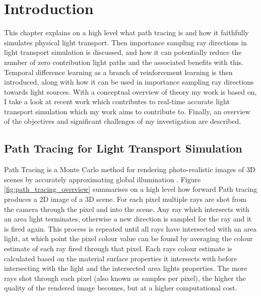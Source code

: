 \documentclass[../dissertation.tex]{subfiles}
\begin{document}
\chapter{Introduction}
\label{chap:context}


This chapter explains on a high level what path tracing is and how it faithfully
simulates physical light transport. Then importance sampling ray directions in light
transport simulation is discussed, and how it can potentially reduce the number 
of zero contribution light paths and the associated benefits with this. Temporal 
difference learning as a branch of reinforcement learning is then introduced, 
along with how it can be used in importance sampling ray directions towards 
light sources. With a conceptual overview of theory my work is based on, I take 
a look at recent work which contributes to real-time accurate light transport 
simulation which my work aims to contribute to. Finally, an overview of the 
objectives and significant challenges of my investigation are described.


\section{Path Tracing for Light Transport Simulation}
\label{sec:conceptual_path_trace}
Path Tracing is a Monte Carlo method for rendering photo-realistic images of 3D 
scenes by accurately approximating global illumination \cite{christensen2016path}.
Figure \ref{fig:path_tracing_overview} summarises on a high level how forward Path tracing produces a 
2D image of a 3D scene. For each pixel multiple rays are shot from the camera through the 
pixel and into the scene. Any ray which intersects with an area light terminates, 
otherwise a new direction is sampled for the ray and it is fired again. This process 
is repeated until all rays have intersected with an area light, at which point the pixel 
colour value can  be found by averaging the colour estimate of each ray fired 
through that pixel. Each rays colour estimate is calculated based on the material 
surface properties it intersects with before intersecting with the light and the
intersected area lights properties. The more rays shot through each pixel (also 
known as samples per pixel), the higher the quality of the rendered image 
becomes, but at a higher computational cost.
\end{document}
